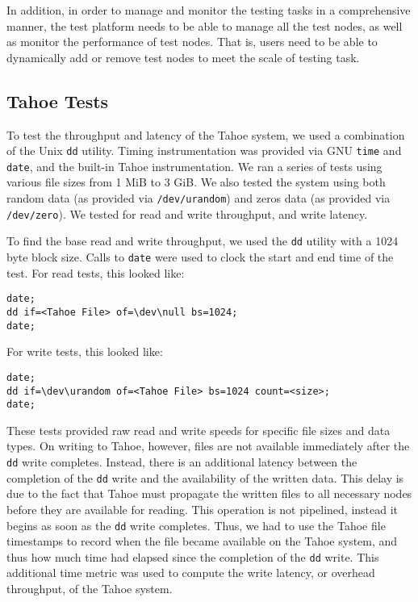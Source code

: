 \documentclass[11pt]{article}
\begin{document}
In addition, in order to manage and monitor the testing tasks in a 
comprehensive manner, the test platform needs to be able to manage 
all the test nodes, as well as monitor the performance of test nodes. 
That is, users need to be able to dynamically add or remove test 
nodes to meet the scale of testing task. 

\subsection{Tahoe Tests}

To test the throughput and latency of the Tahoe system, we used a
combination of the Unix \texttt{dd} utility. Timing instrumentation
was provided via GNU \texttt{time} and \texttt{date}, and the built-in Tahoe
instrumentation. We ran a series of tests using various file sizes
from 1 MiB to 3 GiB. We also tested the system using both random data
(as provided via \texttt{/dev/urandom}) and zeros data (as provided
via \texttt{/dev/zero}). We tested for read and write throughput, and
write latency.

To find the base read and write throughput, we used the \texttt{dd}
utility with a 1024 byte block size. Calls to \texttt{date} were used
to clock the start and end time of the test. For read tests, this looked like:
\begin{verbatim}
date;
dd if=<Tahoe File> of=\dev\null bs=1024;
date;
\end{verbatim}
For write tests, this looked like:
\begin{verbatim}
date;
dd if=\dev\urandom of=<Tahoe File> bs=1024 count=<size>;
date;
\end{verbatim}

These tests provided raw read and write speeds for specific file sizes
and data types. On writing to Tahoe, however, files are not available
immediately after the \texttt{dd} write completes. Instead, there is an
additional latency between the completion of the \texttt{dd} write
and the availability of the written data. This delay is due to the fact
that Tahoe must propagate the written files to all necessary nodes
before they are available for reading. This operation is not pipelined,
instead it begins as soon as the \texttt{dd} write completes. Thus, we
had to use the Tahoe file timestamps to record when the file became
available on the Tahoe system, and thus how much time had elapsed
since the completion of the \texttt{dd} write. This additional time
metric was used to compute the write latency, or overhead throughput, of the
Tahoe system.
\end{document}
